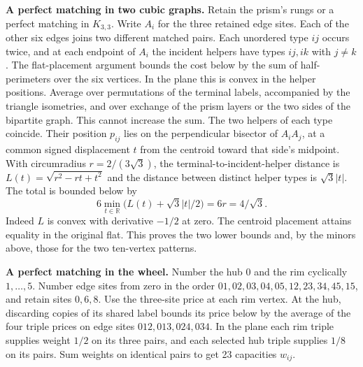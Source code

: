 \documentclass[11pt,letterpaper]{article}
\begin{document}
\textbf{A perfect matching in two cubic graphs.} Retain the prism's rungs or a perfect matching in \(K_{3,3}\). Write \(A_i\) for the three retained edge sites. Each of the other six edges joins two different matched pairs. Each unordered type \(ij\) occurs twice, and at each endpoint of \(A_i\) the incident helpers have types \(ij,ik\) with \(j\ne k\). The flat-placement argument bounds the cost below by the sum of half-perimeters over the six vertices. In the plane this is convex in the helper positions. Average over permutations of the terminal labels, accompanied by the triangle isometries, and over exchange of the prism layers or the two sides of the bipartite graph. This cannot increase the sum. The two helpers of each type coincide. Their position \(p_{ij}\) lies on the perpendicular bisector of \(A_iA_j\), at a common signed displacement \(t\) from the centroid toward that side's midpoint. With circumradius \(r=2/(3\sqrt3)\), the terminal-to-incident-helper distance is \(L(t)=\sqrt{r^2-rt+t^2}\) and the distance between distinct helper types is \(\sqrt3|t|\). The total is bounded below by
\[
                  6\min_{t\in\mathbb R}\big(L(t)+\sqrt3|t|/2\big)=6r=4/\sqrt3.
\]
Indeed \(L\) is convex with derivative \(-1/2\) at zero. The centroid placement attains equality in the original flat. This proves the two lower bounds and, by the minors above, those for the two ten-vertex patterns.

\textbf{A perfect matching in the wheel.} Number the hub \(0\) and the rim cyclically \(1,\ldots,5\). Number edge sites from zero in the order \(01,02,03,04,05,12,23,34,45,15\), and retain sites \(0,6,8\). Use the three-site price at each rim vertex. At the hub, discarding copies of its shared label bounds its price below by the average of the four triple prices on edge sites \(012,013,024,034\). In the plane each rim triple supplies weight \(1/2\) on its three pairs, and each selected hub triple supplies \(1/8\) on its pairs. Sum weights on identical pairs to get 23 capacities \(w_{ij}\).
\end{document}
